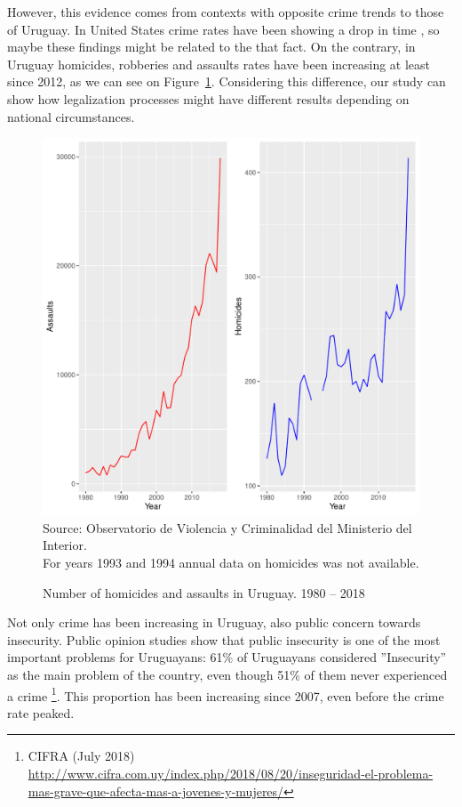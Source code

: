 \documentclass[11pt]{article}
\begin{document}
However, this evidence comes from contexts with opposite crime trends to those of Uruguay. In United States crime rates have been showing a drop in time \citep{gramlich5facts, james2018recent}, so maybe these findings might be related to the that fact. On the contrary, in Uruguay homicides, robberies and assaults rates have been increasing at least since 2012, as we can see on Figure~\ref{fig:homrap19802017}. Considering this difference, our study can show how legalization processes might have different results depending on national circumstances.

\begin{figure}[H]
	\centering
	\caption{Number of homicides and assaults in Uruguay. 1980 -- 2018} 
	\label{fig:homrap19802017}
	\includegraphics[width=.7\textwidth]{evo_delitos.pdf}
	\\
    \scriptsize{Source: Observatorio de Violencia y Criminalidad del Ministerio del Interior. \\ For years 1993 and 1994 annual data on homicides was not available.} 
\end{figure}

Not only crime has been increasing in Uruguay, also public concern towards insecurity. Public opinion studies show that public insecurity is one of the most important problems for Uruguayans: 61\% of Uruguayans considered ''Insecurity'' as the main problem of the country, even though 51\% of them never experienced a crime \footnote{CIFRA (July 2018) \url{http://www.cifra.com.uy/index.php/2018/08/20/inseguridad-el-problema-mas-grave-que-afecta-mas-a-jovenes-y-mujeres/}}. This proportion has been increasing since 2007, even before the crime rate peaked.
\end{document}
